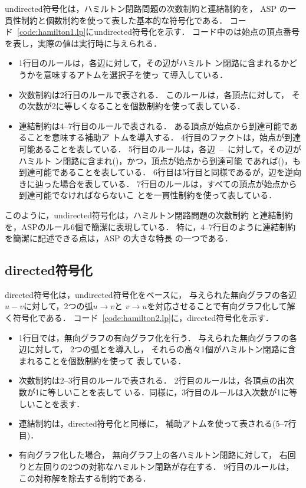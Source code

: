 \textsf{undirected}符号化は，ハミルトン閉路問題の次数制約と連結制約を，
ASP の一貫性制約と個数制約を使って表した基本的な符号化である．
コード~\ref{code:hamilton1.lp}に\textsf{undirected}符号化を示す．
コード中のは始点の頂点番号を表し，実際の値は実行時に与えられる．
\begin{itemize}
\item 1行目のルールは，各辺に対して，その辺がハミルト
  ン閉路に含まれるかどうかを意味するアトムを選択子を使っ
  て導入している．
\item 次数制約は2行目のルールで表される．
  このルールは，各頂点に対して，
  その次数が2に等しくなることを個数制約を使って表している．
\item 連結制約は4--7行目のルールで表される．
  ある頂点が始点から到達可能であることを意味する補助ア
  トムを導入する．
  4行目のファクトは，始点が到達可能あることを表している．
  5行目のルールは，各辺~--~に対して，その辺がハミルト
  ン閉路に含まれ()，かつ，頂点が始点から到達可能
  であれば()，も到達可能であることを表している．
  6行目は5行目と同様であるが，辺を逆向きに辿った場合を表している．
  7行目のルールは，すべての頂点が始点から到達可能でなければならないこ
  とを一貫性制約を使って表している．
\end{itemize}
このように，\textsf{undirected}符号化は，ハミルトン閉路問題の次数制約
と連結制約を，ASPのルール6個で簡潔に表現している．
特に，4--7行目のように連結制約を簡潔に記述できる点は，ASP の大きな特長
の一つである．

\subsection{\textsf{directed}符号化}

\textsf{directed}符号化は，\textsf{undirected}符号化をベースに，
与えられた無向グラフの各辺$u-v$に対して，2つの弧$u\rightarrow v$と
$v\rightarrow u$を対応させることで有向グラフ化して解く符号化である．
コード~\ref{code:hamilton2.lp}に，\textsf{directed}符号化を示す．
\begin{itemize}
\item 1行目では，無向グラフの有向グラフ化を行う．
  与えられた無向グラフの各辺に対して，
  2つの弧とを導入し，
  それらの高々1個がハミルトン閉路に含まれることを個数制約を使って
  表している．
\item 次数制約は2--3行目のルールで表される．
  2行目のルールは，各頂点の出次数が1に等しいことを表して
  いる．同様に，3行目のルールは入次数が1に等しいことを表す．
\item 連結制約は，\textsf{directed}符号化と同様に，
  補助アトムを使って表される(5--7行目)．
\item 有向グラフ化した場合，
  無向グラフ上の各ハミルトン閉路に対して，
  右回りと左回りの2つの対称なハミルトン閉路が存在する．
  9行目のルールは，この対称解を除去する制約である．
\end{itemize}

